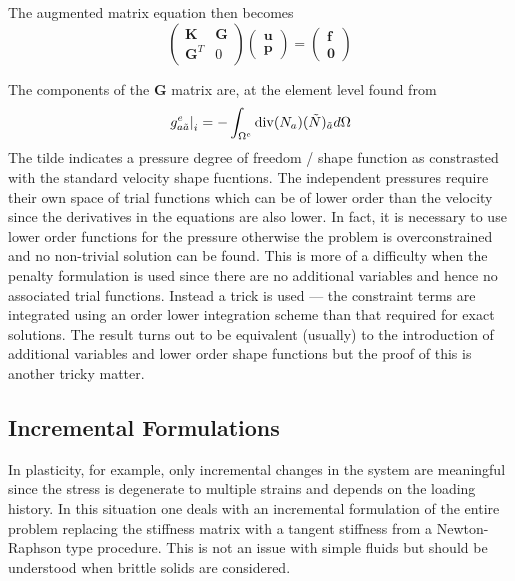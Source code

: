\documentclass[10pt]{article}
\begin{document}
The augmented matrix equation then becomes  
\begin{equation}
	\left( \begin{array}{cc} \mathbf{K} & \mathbf{G} \\ \mathbf{G}^T &  0 \end{array} \right) 
	\left( \begin{array}{c} \mathbf{u} \\  \mathbf{p} \end{array} \right)= 
	\left( \begin{array}{c} \mathbf{f} \\  \mathbf{0} \end{array} \right)
\end{equation}

The components of the $\mathbf{G}$ matrix are, at the element level found from 
	\begin{equation}
	\left. 	g^e_{a\tilde{a}}  \right|_{i} = -\int_{\Omega^e} {\rm div}(N_a) (\tilde{N})_{\tilde{a}} d\Omega
	\end{equation}
The tilde indicates a pressure degree of freedom / shape function as
constrasted with the standard velocity shape fucntions.
The independent pressures require their own space of trial functions which can be of lower order than
the velocity since the derivatives in the equations are also lower. 
In fact, it is necessary to use lower order functions for the pressure otherwise
the problem is overconstrained and no non-trivial solution can be found.
This is more of a difficulty when the penalty formulation is used since
there are no additional variables and hence no associated trial functions.
Instead a trick is used --- the constraint terms are integrated using
an order lower integration scheme than that required for exact solutions.
The result turns out to be equivalent (usually) to the introduction of 
additional variables and lower order shape functions but the proof of this
is another tricky matter.




\subsection{Incremental Formulations}
	
	In plasticity, for example, only incremental changes in the system are
	meaningful since the stress is degenerate to multiple strains and depends 
	on the loading history. In this situation one deals with an incremental 
	formulation of the entire problem replacing the stiffness matrix with 
	a tangent stiffness from a Newton-Raphson type procedure. This is not 
	an issue with simple fluids but should be understood when brittle solids 
	are considered.
		
\end{document}
